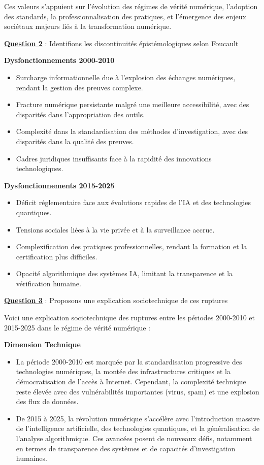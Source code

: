 \documentclass[12pt, a4paper]{article}
\newcommand{\question}[1]{\textbf{\underline{Question #1}}}
\begin{document}
\begin{enumerate}[label=\textbf{\arabic*.}]
		Ces valeurs s'appuient sur l'évolution des régimes de vérité numérique, l'adoption des standards, la professionnalisation des pratiques, et l'émergence des enjeux sociétaux majeurs liés à la transformation numérique.
		
		\question{2} : Identifions les discontinuités épistémologiques selon Foucault
		
		\textbf{Dysfonctionnements 2000-2010}
		\begin{itemize}
			\item Surcharge informationnelle due à l'explosion des échanges numériques, rendant la gestion des preuves complexe.
			\item Fracture numérique persistante malgré une meilleure accessibilité, avec des disparités dans l'appropriation des outils.
			\item Complexité dans la standardisation des méthodes d'investigation, avec des disparités dans la qualité des preuves.
			\item Cadres juridiques insuffisants face à la rapidité des innovations technologiques.
		\end{itemize}
		
		\textbf{Dysfonctionnements 2015-2025}
		\begin{itemize}
			\item Déficit réglementaire face aux évolutions rapides de l'IA et des technologies quantiques.
			\item Tensions sociales liées à la vie privée et à la surveillance accrue.
			\item Complexification des pratiques professionnelles, rendant la formation et la certification plus difficiles.
			\item Opacité algorithmique des systèmes IA, limitant la transparence et la vérification humaine.
		\end{itemize}
		
		\question{3} : Proposons une explication sociotechnique de ces ruptures
		
		Voici une explication sociotechnique des ruptures entre les périodes 2000-2010 et 2015-2025 dans le régime de vérité numérique :
		
		\textbf{Dimension Technique}
		\begin{itemize}
			\item La période 2000-2010 est marquée par la standardisation progressive des technologies numériques, la montée des infrastructures critiques et la démocratisation de l'accès à Internet. Cependant, la complexité technique reste élevée avec des vulnérabilités importantes (virus, spam) et une explosion des flux de données.
			\item De 2015 à 2025, la révolution numérique s'accélère avec l'introduction massive de l'intelligence artificielle, des technologies quantiques, et la généralisation de l'analyse algorithmique. Ces avancées posent de nouveaux défis, notamment en termes de transparence des systèmes et de capacités d'investigation humaines.
		\end{itemize}
		

\end{enumerate}
\end{document}

